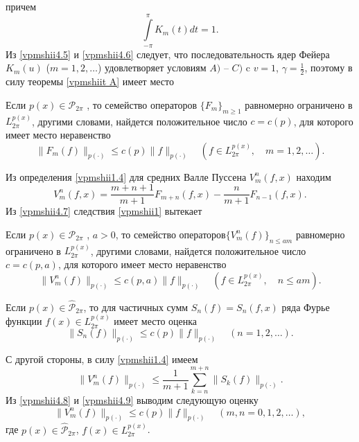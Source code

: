 причем
\begin{equation}\label{vpmshii4.6}
    \int\limits_{-\pi}^{\pi}K_{m}(t)dt=1.
\end{equation}
Из \eqref{vpmshii4.5} и \eqref{vpmshii4.6} следует, что последовательность ядер Фейера $K_{m}(u)$ ($m=1,2,\ldots$) удовлетворяет условиям $A)$ -- $C)$ c $v=1$, $\gamma=\frac12$, поэтому в силу теоремы \ref{vpmshiit A} имеет место
\begin{corollary}\label{vpmshii1}
 Если $ p(x)\in \mathcal{ P}_{2\pi} $ ,  то семейство операторов $\{F_{m}\}_{m\geq1}$ равномерно
ограничено в $L_{2\pi}^{p(x)}$, другими словами, найдется положительное число $c=c(p)$, для которого имеет место неравенство
$$
 \|F_{m}(f)\|_{p(\cdot)}\le c(p)\|f\|_{p(\cdot)}\quad  (f\in L_{2\pi}^{p(x)},\quad m=1,2,\ldots).
 $$
\end{corollary}

Из определения \eqref{vpmshii1.4} для средних Валле Пуссена $V_m^n(f,x)$ находим
\begin{equation}\label{vpmshii4.7}
    V_m^n(f,x)=\frac{m+n+1}{m+1}F_{m+n}(f,x)-\frac{n}{m+1}F_{n-1}(f,x).
\end{equation}
Из \eqref{vpmshii4.7} следствия \ref{vpmshii1} вытекает
\begin{corollary}\label{vpmshii2}
 Если $ p(x)\in \mathcal{ P}_{2\pi} $ , $a>0$,  то семейство операторов\linebreak $\{V_{m}^n(f)\}_{n\le am}$ равномерно
ограничено в $L_{2\pi}^{p(x)}$, другими словами, найдется положительное число $c=c(p,a)$, для которого имеет место неравенство
$$
 \|V_m^n(f)\|_{p(\cdot)}\le c(p,a)\|f\|_{p(\cdot)}\quad  (f\in L_{2\pi}^{p(x)},\quad n\le am).
 $$
\end{corollary}

Если $ p(x)\in \hat{\mathcal{ P}}_{2\pi} $, то  для частичных сумм
 $S_n(f)=S_n(f,x)$ ряда Фурье функции $f(x)\in L^{p(x)}_{2\pi}$  имеет место \cite{vpmshiiShar2} оценка
 \begin{equation}\label{vpmshii4.8}
    \|S_n(f)\|_{p(\cdot)}\le c(p)\|f\|_{p(\cdot)}\quad(n=1,2,\ldots).
 \end{equation}

С другой стороны, в силу \eqref{vpmshii1.4} имеем
\begin{equation}\label{vpmshii4.9}
  \|V_m^n(f)\|_{p(\cdot)}\le \frac{1}{m+1}\sum_{k=n}^{m+n}\|S_k(f)\|_{p(\cdot)}.
 \end{equation}
Из \eqref{vpmshii4.8} и \eqref{vpmshii4.9} выводим следующую оценку
\begin{equation}\label{vpmshii4.10}
  \|V_m^n(f)\|_{p(\cdot)}\le c(p)\|f\|_{p(\cdot)}\quad(m,n=0,1,2,\ldots),
 \end{equation}
где $ p(x)\in \hat{\mathcal{ P}}_{2\pi} $, $f(x)\in L^{p(x)}_{2\pi}$.










